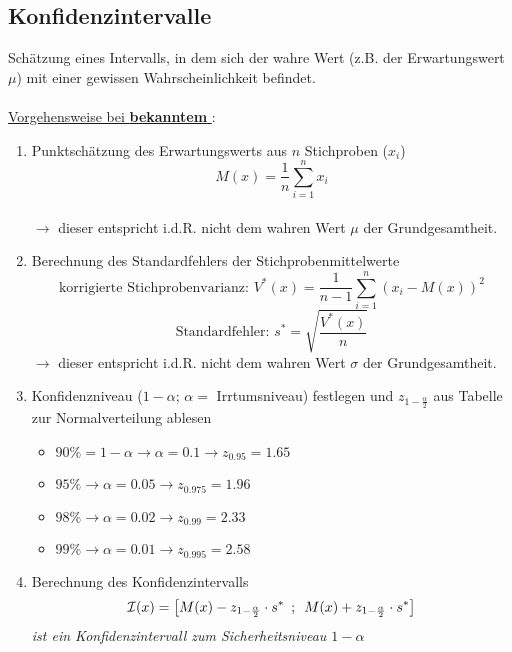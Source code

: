 \subsection{Konfidenzintervalle}

Schätzung eines Intervalls, in dem sich der wahre Wert (z.B. der Erwartungswert~\(\mu\)) mit einer gewissen Wahrscheinlichkeit befindet.
\\\\
\underline{Vorgehensweise bei \textbf{bekanntem} \boldmath{\(\sigma\)}}:
\begin{enumerate}
    \item Punktschätzung des Erwartungswerts aus \(n\) Stichproben (\(x_i\))
            \[M(x)=\frac{1}{n}\sum_{i=1}^{n}x_i\]\\
            \(\rightarrow\) dieser entspricht i.d.R. nicht dem wahren Wert \(\mu\) der Grundgesamtheit.
    \item Berechnung des Standardfehlers der Stichprobenmittelwerte
            \[\text{korrigierte Stichprobenvarianz: }V^*(x)=\frac{1}{n-1}\sum_{i=1}^{n}(x_i-M(x))^2\]
            \[\text{Standardfehler: }s^*=\sqrt{\frac{V^*(x)}{n}}\]
            \(\rightarrow\) dieser entspricht i.d.R. nicht dem wahren Wert \(\sigma\) der Grundgesamtheit.
    \item Konfidenzniveau (\(1-\alpha\); \(\alpha=\) Irrtumsniveau) festlegen und \(z_{1-\frac{\alpha}{2}}\) aus Tabelle zur Normalverteilung ablesen
        \begin{itemize}
            \item \(90\% = 1-\alpha \rightarrow \alpha=0.1\rightarrow z_{0.95}=1.65\)
            \item \(95\% \rightarrow \alpha=0.05\rightarrow z_{0.975}=1.96\)
            \item \(98\% \rightarrow \alpha=0.02\rightarrow z_{0.99}=2.33\)
            \item \(99\% \rightarrow \alpha=0.01\rightarrow z_{0.995}=2.58\)
        \end{itemize}
    \item Berechnung des Konfidenzintervalls
    \begin{equation*}
        \mathcal{I}(x) = \left[M(x) - z_{1-\frac{\alpha}{2}} \cdot s^*\hspace{0.5em}; \hspace{0.5em}M(x) + z_{1-\frac{\alpha}{2}} \cdot s^*\right]
    \end{equation*}
    \emph{ist ein Konfidenzintervall zum Sicherheitsniveau \(1-\alpha\)}\\
\end{enumerate}

